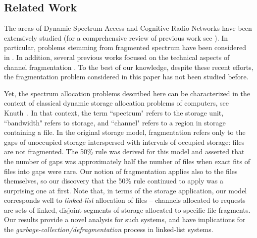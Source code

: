 \documentclass{amsart}
\begin{document}
\iffalse
\footnote{Ignoring simple scaling differences,
Knuth's model can be put in our context by disallowing
fragmentation:  a frequency band (channel) allocated to a packet
must be contained entirely within a single gap having a size at
least that of the packet. His 50\% rule in the model without
fragmentation says that, assuming that the probability of exact fits
is negligible; that channel sizes are small relative to the size of
the spectrum; and that the system is operating near steady state,
then the number of gaps is typically around  the number of
packets.}
\fi

\iffalse
Since, the Markovian description is quite intricate, the convergence in distribution of
the state of the system at time  when  goes to infinity is proved only for some
distributions of sizes.
\fi









\subsection*{Related Work}\label{sec:related}

The areas of Dynamic Spectrum Access and Cognitive Radio Networks have been extensively studied (for a comprehensive review of previous work see
\cite{AkyildizLVM2006,AkyildizLC2009,KrenikWD2007,MahonenZ2007}). In particular, problems stemming from fragmented  spectrum  have been considered in \cite{JiaZS2008,YuanBahl2007,QinetiQ2006}. In addition, several previous works focused on the technical aspects of channel fragmentation \cite{GeirhoferTS2008,GhasemiS2008,Horne2005,HouYZSZ2009,JondralW2004,MahmoudYA2009,Rajbanshi2007}. To the best of our knowledge, despite these recent efforts, the fragmentation problem considered in this paper has not been studied before.



Yet, the  spectrum allocation  problems described here  can  be
characterized in  the context of classical dynamic  storage allocation
problems of computers,  see Knuth~\cite{Knuth1997}. In that context,
the term ``spectrum" refers to the  storage unit, ``bandwidth"
refers to storage, and ``channel" refers  to a region in storage
containing a file.  In the original storage model, fragmentation
refers only to the gaps of unoccupied storage interspersed with
intervals of occupied storage: files are not fragmented.  The 50\%
rule was derived for this model and asserted that the number of gaps
was approximately half the number of files when exact fits of files
into gaps were rare.  Our notion of fragmentation applies also to
the files themselves, so our discovery that the 50\% rule continued
to apply was a surprising one at first. Note that, in terms of the
storage application, our model corresponds well to {\it linked-list}
allocation of files -- channels allocated to requests are sets of linked, disjoint
segments of storage allocated to specific file fragments. Our results provide
a novel analysis for such systems, and have
implications for the {\em garbage-collection/defragmentation}
process in linked-list systems.
\end{document}

